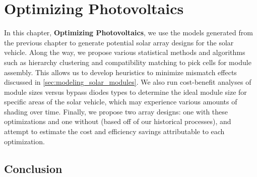 \chapter{Optimizing Photovoltaics}\label{chapter:optimizing_pvs}

In this chapter, \textbf{Optimizing Photovoltaics}, we use the models generated
from the previous chapter to generate potential solar array designs for the
solar vehicle. Along the way, we propose various statistical methods and
algorithms such as hierarchy clustering and compatibility matching to pick cells
for module assembly. This allows us to develop heuristics to minimize mismatch
effects discussed in \autoref{sec:modeling_solar_modules}. We also run
cost-benefit analyses of module sizes versus bypass diodes types to determine
the ideal module size for specific areas of the solar vehicle, which may
experience various amounts of shading over time. Finally, we propose two array
designs: one with these optimizations and one without (based off of our
historical processes), and attempt to estimate the cost and efficiency savings
attributable to each optimization.





\section{Conclusion}\label{sec:optimizing_pvs_conclusion}

